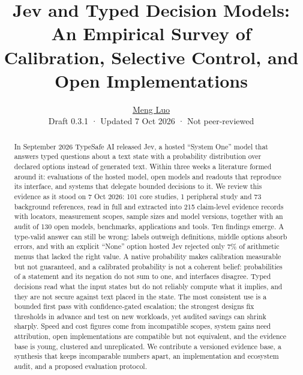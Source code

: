 \documentclass[10.5pt,a4paper]{article}
\title{\vspace{-1.2em}Jev and Typed Decision Models: An Empirical Survey of Calibration, Selective Control, and Open Implementations}
\author{\large \href{https://eurekaleo.github.io/}{Meng Luo}\\[5pt]\normalsize Draft 0.3.1 · Updated 7 Oct 2026 · Not peer-reviewed}
\date{}
\begin{document}
\maketitle
\begin{abstract}\noindent
In September 2026 TypeSafe AI released Jev, a hosted “System One” model that answers typed questions about a text state with a probability distribution over declared options instead of generated text. Within three weeks a literature formed around it: evaluations of the hosted model, open models and readouts that reproduce its interface, and systems that delegate bounded decisions to it. We review this evidence as it stood on 7 Oct 2026: 101 core studies, 1 peripheral study and 73 background references, read in full and extracted into 215 claim-level evidence records with locators, measurement scopes, sample sizes and model versions, together with an audit of 130 open models, benchmarks, applications and tools. Ten findings emerge. A type-valid answer can still be wrong: labels outweigh definitions, middle options absorb errors, and with an explicit “None” option hosted Jev rejected only 7\% of arithmetic menus that lacked the right value. A native probability makes calibration measurable but not guaranteed, and a calibrated probability is not a coherent belief: probabilities of a statement and its negation do not sum to one, and interfaces disagree. Typed decisions read what the input states but do not reliably compute what it implies, and they are not secure against text placed in the state. The most consistent use is a bounded first pass with confidence-gated escalation; the strongest designs fix thresholds in advance and test on new workloads, yet audited savings can shrink sharply. Speed and cost figures come from incompatible scopes, system gains need attribution, open implementations are compatible but not equivalent, and the evidence base is young, clustered and unreplicated. We contribute a versioned evidence base, a synthesis that keeps incomparable numbers apart, an implementation and ecosystem audit, and a proposed evaluation protocol.
\end{abstract}


















\appendix



\end{document}
